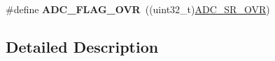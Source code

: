 \begin{DoxyCompactItemize}
\item 
\#define {\bfseries A\+D\+C\+\_\+\+F\+L\+A\+G\+\_\+\+O\+VR}~((uint32\+\_\+t)\hyperlink{group___peripheral___registers___bits___definition_ga1e5211d5e3e53cdedf4d9d6fe4ce2a45}{A\+D\+C\+\_\+\+S\+R\+\_\+\+O\+VR})\hypertarget{group___a_d_c__flags__definition_ga6e8f399d2af342bd18b9f5803cb986e7}{}\label{group___a_d_c__flags__definition_ga6e8f399d2af342bd18b9f5803cb986e7}

\end{DoxyCompactItemize}


\subsection{Detailed Description}
